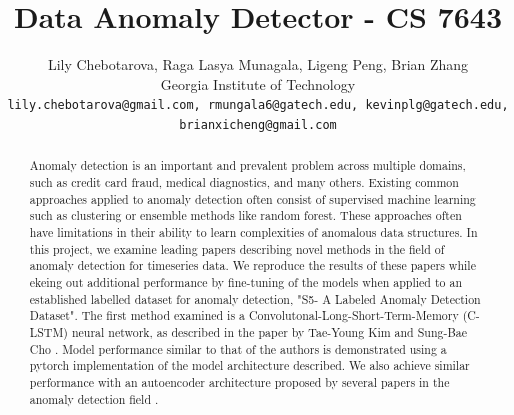 \documentclass[10pt,twocolumn,letterpaper]{article}
\begin{document}
\title{Data Anomaly Detector - CS 7643}

\author{Lily Chebotarova, Raga Lasya Munagala, Ligeng Peng, Brian Zhang\\
Georgia Institute of Technology\\
{\tt\small lily.chebotarova@gmail.com, rmungala6@gatech.edu, kevinplg@gatech.edu, brianxicheng@gmail.com}
}


\maketitle

\begin{abstract}
   Anomaly detection is an important and prevalent problem across multiple domains, such as credit card fraud, medical diagnostics, and many others. 
   Existing common approaches applied to anomaly detection often consist of supervised machine learning such as clustering or ensemble methods like random forest.
   These approaches often have limitations in their ability to learn complexities of anomalous data structures.
   In this project, we examine leading papers describing novel methods in the field of anomaly detection for timeseries data. We reproduce the results of these
   papers while ekeing out additional performance by fine-tuning of the models when applied to an established labelled dataset for anomaly detection, "S5- A Labeled Anomaly Detection Dataset". 
   The first method examined is a Convolutonal-Long-Short-Term-Memory (C-LSTM) neural network, as described in the paper by Tae-Young Kim and Sung-Bae Cho \cite{kim2018web}.  
   Model performance similar to that of the authors is demonstrated using a pytorch implementation of the model architecture described. 
   We also achieve similar performance with an autoencoder architecture proposed by several papers in the anomaly detection field \cite{hagemann2020reconstruction, wong2022aer}.
\end{abstract}
\end{document}
